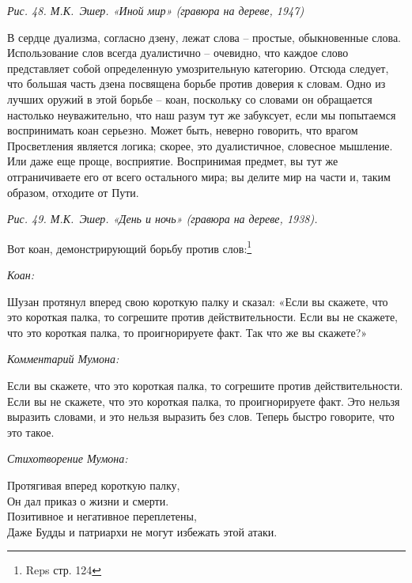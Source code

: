 \documentclass[../main.tex]{subfiles}
\begin{document}
\emph{Рис. 48. М.К.~Эшер. «Иной мир» (гравюра на дереве, 1947)}

В сердце дуализма, согласно дзену, лежат слова \--- простые, обыкновенные слова. Использование слов всегда дуалистично \--- очевидно, что каждое слово представляет собой определенную умозрительную категорию. Отсюда следует, что большая часть дзена посвящена борьбе против доверия к словам. Одно из лучших оружий в этой борьбе \--- коан, поскольку со словами он обращается настолько неуважительно, что наш разум тут же забуксует, если мы попытаемся воспринимать коан серьезно. Может быть, неверно говорить, что врагом Просветления является логика; скорее, это дуалистичное, словесное мышление. Или даже еще проще, восприятие. Воспринимая предмет, вы тут же отграничиваете его от всего остального мира; вы делите мир на части и, таким образом, отходите от Пути.

\emph{Рис. 49. М.К.~Эшер. «День и ночь» (гравюра на дереве, 1938).}

Вот коан, демонстрирующий борьбу против слов:\footnote{Reps стр. 124}

\begin{koan}
    \emph{\normalsize Коан:}
    \vspace{2pt}

    Шузан протянул вперед свою короткую палку и сказал: «Если вы скажете, что это короткая палка, то согрешите против действительности. Если вы не скажете, что это короткая палка, то проигнорируете факт. Так что же вы скажете?»
\end{koan}

\begin{koan}
    \emph{\normalsize Комментарий Мумона:}
    \vspace{2pt}

    Если вы скажете, что это короткая палка, то согрешите против действительности. Если вы не скажете, что это короткая палка, то проигнорируете факт. Это нельзя выразить словами, и это нельзя выразить без слов. Теперь быстро говорите, что это такое.
\end{koan}

\begin{koan}
    \emph{\normalsize Стихотворение Мумона:}

    \begin{mumonverse}
        Протягивая вперед короткую палку, \\
        Он дал приказ о жизни и смерти. \\
        Позитивное и негативное переплетены, \\
        Даже Будды и патриархи не могут избежать этой атаки.
    \end{mumonverse}
\end{koan}
\end{document}
